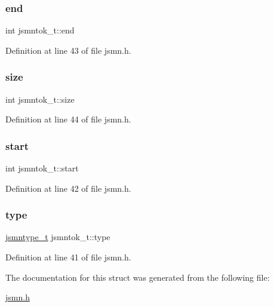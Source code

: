 \subsubsection{\texorpdfstring{end}{end}}
{\footnotesize\ttfamily int jsmntok\+\_\+t\+::end}



Definition at line 43 of file jsmn.\+h.

\hypertarget{structjsmntok__t_a8ac3694b7335456c8e602197778883db}{}\label{structjsmntok__t_a8ac3694b7335456c8e602197778883db} 
\subsubsection{\texorpdfstring{size}{size}}
{\footnotesize\ttfamily int jsmntok\+\_\+t\+::size}



Definition at line 44 of file jsmn.\+h.

\hypertarget{structjsmntok__t_a0a8f55d0095f268ce8e224fe1234acd0}{}\label{structjsmntok__t_a0a8f55d0095f268ce8e224fe1234acd0} 
\subsubsection{\texorpdfstring{start}{start}}
{\footnotesize\ttfamily int jsmntok\+\_\+t\+::start}



Definition at line 42 of file jsmn.\+h.

\hypertarget{structjsmntok__t_ac03dbd6b83cbcd979eb64702d5b9943e}{}\label{structjsmntok__t_ac03dbd6b83cbcd979eb64702d5b9943e} 
\subsubsection{\texorpdfstring{type}{type}}
{\footnotesize\ttfamily \hyperlink{jsmn_8h_a065320719769f9dc1fbe30094e52802f}{jsmntype\+\_\+t} jsmntok\+\_\+t\+::type}



Definition at line 41 of file jsmn.\+h.



The documentation for this struct was generated from the following file\+:\begin{DoxyCompactItemize}
\item 
\hyperlink{jsmn_8h}{jsmn.\+h}\end{DoxyCompactItemize}
